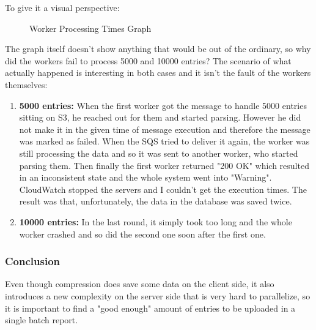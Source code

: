 \newpage

To give it a visual perspective:

\begin{figure}[!ht]
\begin{center}
\end{center}
\caption{Worker Processing Times Graph}
\end{figure}

The graph itself doesn't show anything that would be out of the ordinary, so why did the workers fail to process 5000 and 10000 entries? The scenario of what actually happened is interesting in both cases and it isn't the fault of the workers themselves:

\begin{enumerate}
	\item {\bf 5000 entries: } When the first worker got the message to handle 5000 entries sitting on S3, he reached out for them and started parsing. However he did not make it in the given time of message execution and therefore the message was marked as failed. When the SQS tried to deliver it again, the worker was still processing the data and so it was sent to another worker, who started parsing them. Then finally the first worker returned "200 OK" which resulted in an inconsistent state and the whole system went into "Warning". CloudWatch stopped the servers and I couldn't get the execution times. The result was that, unfortunately, the data in the database was saved twice.
	\item {\bf 10000 entries: } In the last round, it simply took too long and the whole worker crashed and so did the second one soon after the first one.
\end{enumerate}

\subsubsection*{Conclusion}

Even though compression does save some data on the client side, it also introduces a new complexity on the server side that is very hard to parallelize, so it is important to find a "good enough" amount of entries to be uploaded in a single batch report.

